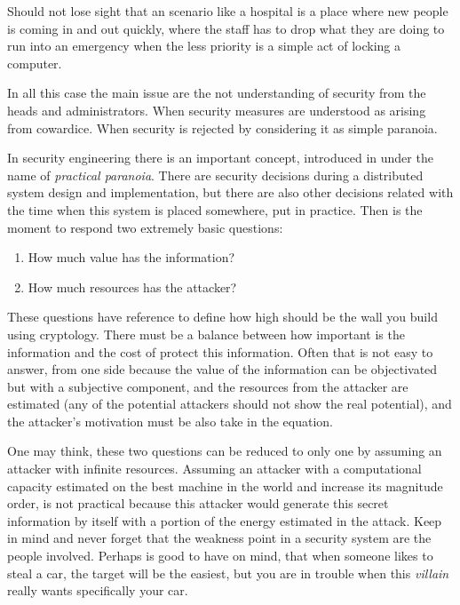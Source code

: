 \documentclass[10pt,a4paper,twoside]{llncs}
\newcommand{\todo}[1]{\texttt{\color{red}TODO:} ``\emph{#1}''}
\begin{document}
Should not lose sight that an scenario like a hospital is a place where new people is coming in and out quickly, where the staff has to drop what they are doing to run into an emergency when the less priority is a simple act of locking a computer.

In all this case the main issue are the not understanding of security from the heads and administrators. When security measures are understood as arising from cowardice. When security is rejected by considering it as simple paranoia.


In security engineering there is an important concept, introduced in \cite{PractCryptoSchneier} under the name of \emph{practical paranoia}. There are security decisions during a distributed system design and implementation, but there are also other decisions related with the time when this system is placed somewhere, put in practice. Then is the moment to respond two extremely basic questions: 

\begin{enumerate}
    \item How much value has the information?
    \item How much resources has the attacker?
\end{enumerate}

These questions have reference to define how high should be the wall you build using cryptology. There must be a balance between how important is the information and the cost of protect this information. Often that is not easy to answer, from one side because the value of the information can be objectivated but with a subjective component, and the resources from the attacker are estimated (any of the potential attackers should not show the real potential), and the attacker's motivation must be also take in the equation.

One may think, these two questions can be reduced to only one by assuming an attacker with infinite resources. Assuming an attacker with a computational capacity estimated on the best machine in the world and increase its magnitude order, is not practical because this attacker would generate this secret information by itself with a portion of the energy estimated in the attack. Keep in mind and never forget that the weakness point in a security system are the people involved. Perhaps is good to have on mind, that when someone likes to steal a car, the target will be the easiest, but you are in trouble when this \emph{villain} really wants specifically your car.
\end{document}
